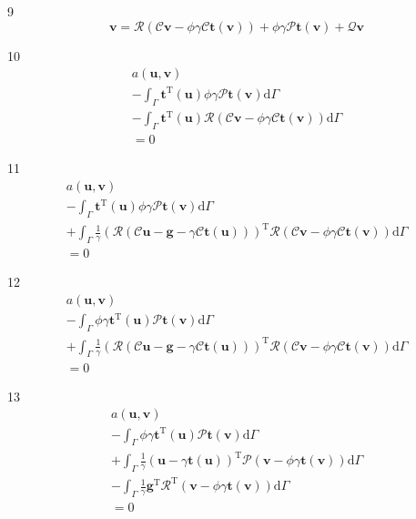 \documentclass[a4paper,12pt]{article}
\begin{document}
9
\begin{equation}
\mathbf{v} =
\mathcal{R}(\mathcal{C}\mathbf{v}-\phi\gamma\mathcal{C}\mathbf{t}(\mathbf{v}))
+\phi\gamma\mathcal{P}\mathbf{t}(\mathbf{v}) + \mathcal{Q}\mathbf{v}
\end{equation}

10
\begin{equation}
\begin{split}
a(\mathbf{u},\mathbf{v})
\\-
\int_\Gamma
\mathbf{t}^{\textrm{T}}(\mathbf{u})
\phi\gamma\mathcal{P}\mathbf{t}(\mathbf{v})
\textrm{d}\Gamma
\\-
\int_\Gamma
\mathbf{t}^\textrm{T}(\mathbf{u})
\mathcal{R}(\mathcal{C}\mathbf{v}-\phi\gamma\mathcal{C}\mathbf{t}(\mathbf{v}))
\textrm{d}\Gamma
\\=
0
\end{split}
\end{equation}

11
\begin{equation}
\begin{split}
a(\mathbf{u},\mathbf{v})
\\-
\int_\Gamma
\mathbf{t}^{\textrm{T}}(\mathbf{u})
\phi\gamma\mathcal{P}\mathbf{t}(\mathbf{v})
\textrm{d}\Gamma
\\+
\int_\Gamma
\frac{1}{\gamma}
(
\mathcal{R}(\mathcal{C}\mathbf{u}-\mathbf{g}-\gamma\mathcal{C}\mathbf{t}(\mathbf{u}))
)^\textrm{T}
\mathcal{R}(\mathcal{C}\mathbf{v}-\phi\gamma\mathcal{C}\mathbf{t}(\mathbf{v}))
\textrm{d}\Gamma
\\=
0
\end{split}
\end{equation}

12
\begin{equation}
\begin{split}
a(\mathbf{u},\mathbf{v})
\\-
\int_\Gamma
\phi\gamma\mathbf{t}^{\textrm{T}}(\mathbf{u})\mathcal{P}\mathbf{t}(\mathbf{v})
\textrm{d}\Gamma
\\+
\int_\Gamma
\frac{1}{\gamma}
(
\mathcal{R}(\mathcal{C}\mathbf{u}-\mathbf{g}-\gamma\mathcal{C}\mathbf{t}(\mathbf{u}))
)^\textrm{T}
\mathcal{R}(\mathcal{C}\mathbf{v}-\phi\gamma\mathcal{C}\mathbf{t}(\mathbf{v}))
\textrm{d}\Gamma
\\=
0
\end{split}
\end{equation}

13
\begin{equation}
\begin{split}
a(\mathbf{u},\mathbf{v})
\\-
\int_\Gamma
\phi\gamma\mathbf{t}^{\textrm{T}}(\mathbf{u})\mathcal{P}\mathbf{t}(\mathbf{v})
\textrm{d}\Gamma
\\+
\int_\Gamma
\frac{1}{\gamma}
(\mathbf{u}-\gamma\mathbf{t}(\mathbf{u}))^\textrm{T}\mathcal{P}
(\mathbf{v}-\phi\gamma\mathbf{t}(\mathbf{v}))
\textrm{d}\Gamma
\\-
\int_\Gamma
\frac{1}{\gamma}
\mathbf{g}^\textrm{T}\mathcal{R}^\textrm{T}
(\mathbf{v}-\phi\gamma\mathbf{t}(\mathbf{v}))
\textrm{d}\Gamma
\\=
0
\end{split}
\end{equation}
\end{document}
